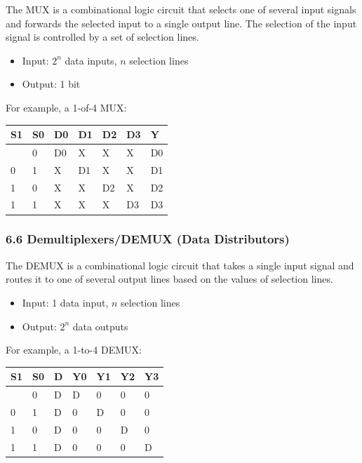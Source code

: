 \documentclass[
  a4paper,
]{article}
\providecommand{\tightlist}{%
  \setlength{\itemsep}{0pt}\setlength{\parskip}{0pt}}
\begin{document}
The MUX is a combinational logic circuit that selects one of several
input signals and forwards the selected input to a single output line.
The selection of the input signal is controlled by a set of selection
lines.

\begin{itemize}
\tightlist
\item
  Input: \(2^n\) data inputs, \(n\) selection lines
\item
  Output: 1 bit
\end{itemize}

For example, a 1-of-4 MUX:

\begin{longtable}[]{@{}lllllll@{}}
\toprule\noalign{}
S1 & S0 & D0 & D1 & D2 & D3 & Y \\
\midrule\noalign{}
\endhead
\bottomrule\noalign{}
\endlastfoot
0 & 0 & D0 & X & X & X & D0 \\
0 & 1 & X & D1 & X & X & D1 \\
1 & 0 & X & X & D2 & X & D2 \\
1 & 1 & X & X & X & D3 & D3 \\
\end{longtable}

\subsubsection{6.6 Demultiplexers/DEMUX (Data
Distributors)}\label{demultiplexersdemux-data-distributors}

The DEMUX is a combinational logic circuit that takes a single input
signal and routes it to one of several output lines based on the values
of selection lines.

\begin{itemize}
\tightlist
\item
  Input: 1 data input, \(n\) selection lines
\item
  Output: \(2^n\) data outputs
\end{itemize}

For example, a 1-to-4 DEMUX:

\begin{longtable}[]{@{}lllllll@{}}
\toprule\noalign{}
S1 & S0 & D & Y0 & Y1 & Y2 & Y3 \\
\midrule\noalign{}
\endhead
\bottomrule\noalign{}
\endlastfoot
0 & 0 & D & D & 0 & 0 & 0 \\
0 & 1 & D & 0 & D & 0 & 0 \\
1 & 0 & D & 0 & 0 & D & 0 \\
1 & 1 & D & 0 & 0 & 0 & D \\
\end{longtable}
\end{document}
